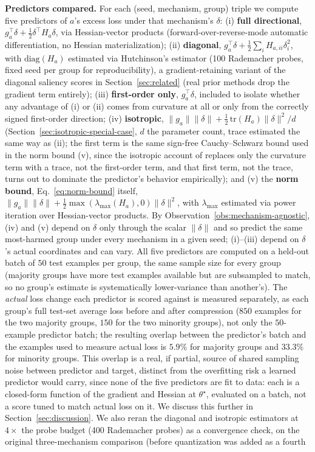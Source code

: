 \documentclass{article}
\newcommand{\theorig}{\theta^\star}
\begin{document}
\textbf{Predictors compared.} For each (seed, mechanism, group) triple we compute five predictors of $a$'s excess loss under that mechanism's $\delta$: (i) \textbf{full directional}, $g_a^\top\delta + \tfrac12\delta^\top H_a\delta$, via Hessian-vector products \citep{pearlmutter1994fast} (forward-over-reverse-mode automatic differentiation, no Hessian materialization); (ii) \textbf{diagonal}, $g_a^\top\delta + \tfrac12\sum_i H_{a,ii}\delta_i^2$, with $\mathrm{diag}(H_a)$ estimated via Hutchinson's estimator \citep{hutchinson1989trace} (100 Rademacher probes, fixed seed per group for reproducibility), a gradient-retaining variant of the diagonal saliency scores in Section~\ref{sec:related} (real prior methods drop the gradient term entirely); (iii) \textbf{first-order only}, $g_a^\top\delta$, included to isolate whether any advantage of (i) or (ii) comes from curvature at all or only from the correctly signed first-order direction; (iv) \textbf{isotropic}, $\|g_a\|\|\delta\| + \tfrac12\,\mathrm{tr}(H_a)\|\delta\|^2/d$ (Section~\ref{sec:isotropic-special-case}, $d$ the parameter count, trace estimated the same way as (ii); the first term is the same sign-free Cauchy--Schwarz bound used in the norm bound (v), since the isotropic account of \citet{liu2025understanding,bellam2024causes,bellam2025explaining} replaces only the curvature term with a trace, not the first-order term, and that first term, not the trace, turns out to dominate the predictor's behavior empirically); and (v) the \textbf{norm bound}, Eq.~\eqref{eq:norm-bound} itself, $\|g_a\|\|\delta\| + \tfrac12\max(\lambda_{\max}(H_a),0)\|\delta\|^2$, with $\lambda_{\max}$ estimated via power iteration over Hessian-vector products. By Observation~\ref{obs:mechanism-agnostic}, (iv) and (v) depend on $\delta$ only through the scalar $\|\delta\|$ and so predict the same most-harmed group under every mechanism in a given seed; (i)--(iii) depend on $\delta$'s actual coordinates and can vary. All five predictors are computed on a held-out batch of $50$ test examples per group, the same sample size for every group (majority groups have more test examples available but are subsampled to match, so no group's estimate is systematically lower-variance than another's). The \emph{actual} loss change each predictor is scored against is measured separately, as each group's full test-set average loss before and after compression ($850$ examples for the two majority groups, $150$ for the two minority groups), not only the $50$-example predictor batch; the resulting overlap between the predictor's batch and the examples used to measure actual loss is $5.9\%$ for majority groups and $33.3\%$ for minority groups. This overlap is a real, if partial, source of shared sampling noise between predictor and target, distinct from the overfitting risk a learned predictor would carry, since none of the five predictors are fit to data: each is a closed-form function of the gradient and Hessian at $\theorig$, evaluated on a batch, not a score tuned to match actual loss on it. We discuss this further in Section~\ref{sec:discussion}. We also reran the diagonal and isotropic estimators at $4\times$ the probe budget (400 Rademacher probes) as a convergence check, on the original three-mechanism comparison (before quantization was added as a fourth 
\end{document}
